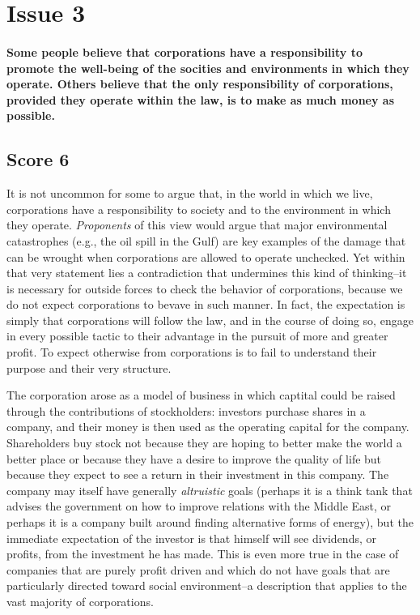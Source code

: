 \section{Issue 3}

\paragraph{Some people believe that corporations have a responsibility to promote the well-being of the socities and environments in which they operate.
Others believe that the only responsibility of corporations, provided they operate within the law, is to make as much money as possible.}

\subsection{Score 6}
It is not uncommon for some to argue that, in the world in which we live, corporations have a responsibility to society and to the environment in which they operate.
\emph{Proponents} of this view would argue that major environmental catastrophes (e.g., the oil spill in the Gulf) are key examples of the damage that can be wrought when corporations are allowed to operate unchecked.
Yet within that very statement lies a contradiction that undermines this kind of thinking--it is necessary for outside forces to check the behavior of corporations, because we do not expect corporations to bevave in such manner.
In fact, the expectation is simply that corporations will follow the law, and in the course of doing so, engage in every possible tactic to their advantage in the pursuit of more and greater profit.
To expect otherwise from corporations is to fail to understand their purpose and their very structure.

The corporation arose as a model of business in which captital could be raised through the contributions of stockholders: investors purchase shares in a company, and their money is then used as the operating capital for the company.
Shareholders buy stock not because they are hoping to better make the world a better place or because they have a desire to improve the quality of life but because they expect to see a return in their investment in this company.
The company may itself have generally \emph{altruistic} goals (perhaps it is a think tank that advises the government on how to improve relations with the Middle East, or perhaps it is a company built around finding alternative forms of energy), but the immediate expectation of the investor is that himself will see dividends, or profits, from the investment he has made.
This is even more true in the case of companies that are purely profit driven and which do not have goals that are particularly directed toward social environment--a description that applies to the vast majority of corporations.

